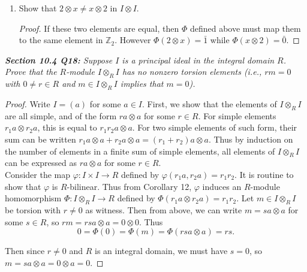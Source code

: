 \documentclass{article}
\begin{document}
\begin{enumerate}[label={(\alph*)}]
      \begin{proof}
        The map $\varphi$ defined in part (a) is $R$-bilinear, so by
        Corollary 12, induces an $R$-module homomorphism $\Phi:I\otimes_R
        I\mapsto\mathbb{Z}_2$ given by $p(x)\otimes q(x)$ to
        $\frac{p(0)}{2}q'(0)$.
      \end{proof}

    \item Show that $2\otimes x \neq x\otimes2$ in $I\otimes I$.
      \begin{proof}
        If these two elements are equal, then $\Phi$ defined above must map
        them to the same element in $\mathbb{Z}_2$. However $\Phi(2\otimes
        x) =\bar{1}$ while $\Phi(x\otimes2) =\bar{0}$.
      \end{proof}
  \end{enumerate}

\it \textbf{Section 10.4 Q18:} Suppose $I$ is a principal ideal in the
  integral domain $R$. Prove that the $R$-module $I\otimes_R I$ has no
  nonzero torsion elements (i.e., $rm=0$ with $0\neq r\in R$ and $m\in
  I\otimes_R I$ implies that $m=0$).

  \begin{proof}
    Write $I=(a)$ for some $a\in I$. First, we show that the elements of
    $I\otimes_RI$ are all simple, and of the form $ra\otimes a$ for some
    $r\in R$. For simple elements $r_1a\otimes r_2a$, this is equal to
    $r_1r_2a\otimes a$. For two simple elements of such form, their sum
    can be written $r_1a\otimes a+r_2a\otimes a =(r_1+r_2)a\otimes a$.
    Thus by induction on the number of elements in a finite sum of simple
    elements, all elements of $I\otimes_RI$ can be expressed as
    $ra\otimes a$ for some $r\in R$. \\

    Consider the map $\varphi:I\times I\rightarrow R$ defined by
    $\varphi(r_1a,r_2a)=r_1r_2$. It is routine to show that $\varphi$ is
    $R$-bilinear. Thus from Corollary 12, $\varphi$ induces an $R$-module
    homomorphism $\Phi:I\otimes_R I\rightarrow R$ defined by
    $\Phi(r_1a\otimes r_2a)=r_1r_2$. Let $m\in I\otimes_R I$ be torsion
    with $r\neq0$ as witness. Then from above, we can write $m=sa\otimes a$
    for some $s\in R$, so $rm=rsa\otimes a=0\otimes0$. Thus
    \[0=\Phi(0)=\Phi(m)=\Phi(rsa\otimes a)=rs.\]

    Then since $r\neq0$ and $R$ is an integral domain, we must have $s=0$,
    so $m=sa\otimes a=0\otimes a=0$.
  \end{proof}
\end{document}
